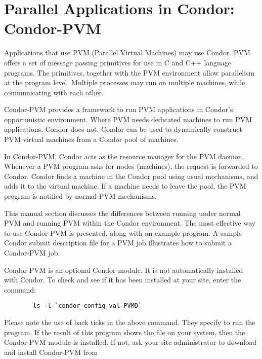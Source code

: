 \section{\label{sec:PVM}Parallel Applications in Condor: Condor-PVM}

\newcommand{\func}[1]{\texttt{#1}}

Applications that use PVM (Parallel Virtual Machines) may use
Condor.
PVM offers a set of message passing primitives for use in
C and C++ language programs.
The primitives, together with the PVM environment
allow parallelism at the program level.
Multiple processes
may run on multiple machines,
while communicating with each other.

Condor-PVM provides a framework to run PVM applications
in Condor's opportunistic environment.
Where PVM needs dedicated machines
to run PVM applications, Condor does not.
Condor can be used to dynamically 
construct PVM virtual machines from a Condor pool of machines.

In Condor-PVM, Condor acts as the
resource manager for the PVM daemon.  Whenever a PVM program asks
for nodes (machines), the request is forwarded to Condor.
Condor finds a machine in the Condor pool using usual mechanisms,
and adds it to the virtual machine.
If a machine needs to leave the pool, the
PVM program is notified by normal PVM mechanisms.

This manual section
discusses the differences between running under normal PVM
and running PVM within the Condor
environment.  The most effective way to use Condor-PVM is
presented, along with an example program.
A sample Condor submit description file for a PVM job illustrates
how to submit a Condor-PVM job.

\Note Condor-PVM is an optional Condor module.  It is not
automatically installed with Condor. To check and see if
it has been installed at your site, enter the command:
\begin{verbatim}
        ls -l `condor_config_val PVMD`
\end{verbatim}
Please note the use of back ticks in the above command.
They specify to run the  program.
If the result of this program shows the
file  on your system, then the Condor-PVM module
is installed.
If not,
ask your site administrator to download and install Condor-PVM from

